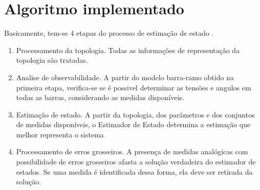 \section{Algoritmo implementado}
Basicamente, tem-se 4 etapas do processo de estimação de estado \cite{Mohamad}. 
\begin{enumerate}
    \item Processamento da topologia. Todas as informações de representação da topologia são tratadas.
    \item Analise de observabilidade. A partir do modelo barra-ramo obtido na primeira etapa, verifica-se se é possivel determinar as tensões e angulos em todas as barras, considerando as medidas disponíveis.
    \item Estimação de estado. A partir da topologia, dos parâmetros e dos conjuntos de medidas disponíveis, o Estimador de Estado determina a estimação que melhor representa o sistema
    \item Processamento de erros grosseiros. A presença de medidas analógicas com possibilidade de erros grosseiros afasta a solução verdadeira do estimador de estados. Se uma medida é identificada dessa forma, ela deve ser retirada da solução. 
    
\end{enumerate}

